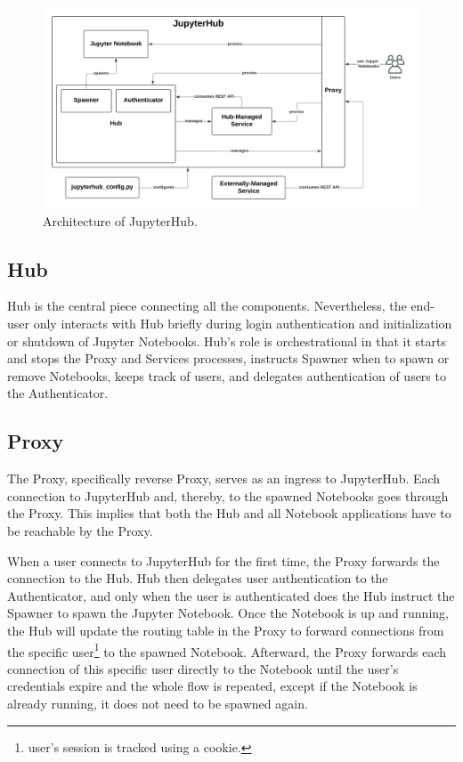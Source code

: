 \documentclass[
  digital,     %
  oneside,     %
  nosansbold,  %
  nocolorbold, %
  lof,         %
  nolot,         %
]{fithesis4}
\begin{document}
\begin{figure}[H]
  \begin{center}
  \includegraphics[width=\textwidth]{figures/jupyer-hub-architecture.png}
  \end{center}
  \caption{Architecture of JupyterHub. }
  \label{fig:jupyter-hub-arch}
\end{figure}

\subsection{Hub}
Hub is the central piece connecting all the components. Nevertheless, the end-user only interacts with Hub briefly during login authentication and initialization or shutdown of Jupyter Notebooks. Hub's role is orchestrational in that it starts and stops the Proxy and Services processes, instructs Spawner when to spawn or remove Notebooks, keeps track of users, and delegates authentication of users to the Authenticator.

\subsection{Proxy}
The Proxy, specifically reverse Proxy, serves as an ingress to JupyterHub. Each connection to JupyterHub and, thereby, to the spawned Notebooks goes through the Proxy. This implies that both the Hub and all Notebook applications have to be reachable by the Proxy\cite{jupyterhub_arch}.

When a user connects to JupyterHub for the first time, the Proxy forwards the connection to the Hub. Hub then delegates user authentication to the Authenticator, and only when the user is authenticated does the Hub instruct the Spawner to spawn the Jupyter Notebook. Once the Notebook is up and running, the Hub will update the routing table in the Proxy to forward connections from the specific user\footnote{user's session is tracked using a cookie.} to the spawned Notebook. Afterward, the Proxy forwards each connection of this specific user directly to the Notebook until the user's credentials expire and the whole flow is repeated, except if the Notebook is already running, it does not need to be spawned again.
\end{document}

